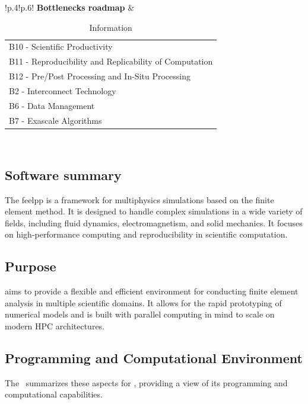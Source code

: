 \begin{table}[!ht]
{{\begin{tabular}{!{\color{numpexgray}\vrule}p{.4\textwidth}!{\color{numpexgray}\vrule}p{.6\textwidth}!{\color{numpexgray}\vrule}}
        \textbf{Bottlenecks roadmap} & \begin{tabular}{l}
B10 - Scientific Productivity\\
B11 - Reproducibility and Replicability of Computation\\
B12 - Pre/Post Processing and In-Situ Processing\\
B2 - Interconnect Technology\\
B6 - Data Management\\
B7 - Exascale Algorithms\\
\end{tabular} \\
        \hline
    \end{tabular}
    }}
    \caption{\Feelpp Information}
\end{table}

\subsection{Software summary}
\label{sec:Feelpp:summary}
The \ac{feelpp} is a \Cpp{} framework for multiphysics simulations based on the finite element method.
It is designed to handle complex simulations in a wide variety of fields, including fluid dynamics, electromagnetism, and solid mechanics.
It focuses on high-performance computing and reproducibility in scientific computation.

\subsection{Purpose}
\label{sec:Feelpp:purpose}
\Feelpp aims to provide a flexible and efficient environment for conducting finite element analysis in multiple scientific domains.
It allows for the rapid prototyping of numerical models and is built with parallel computing in mind to scale on modern HPC architectures.

\subsection{Programming and Computational Environment}
\label{sec::Feelpp:environment_capabilities}

The~ summarizes these aspects for \Feelpp, providing a view of its programming and computational capabilities.

